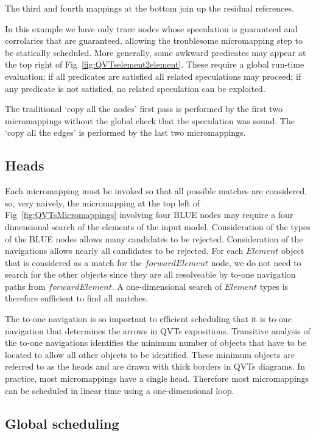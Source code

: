 \documentclass{llncs}
\begin{document}
The third and fourth mappings at the bottom join up the residual references.

In this example we have only trace nodes whose speculation is guaranteed and corrolaries that are guaranteed, allowing the troublesome micromapping step to be statically scheduled. More generally, some awkward predicates may appear at the top right of Fig~\ref{fig:QVTselement2element}. These require a global run-time evaluation; if all predicates are satisfied all related speculations may proceed; if any predicate is not satisfied, no related speculation can be exploited.

The traditional `copy all the nodes' first pass is performed by the first two micromappings without the global check that the speculation was sound. The `copy all the edges' is performed by the last two micromappings.

\subsection{Heads}\label{Heads}

Each micromapping must be invoked so that all possible matches are considered, so, very naively, the micromapping at the top left of Fig~\ref{fig:QVTsMicromappings} involving four BLUE nodes may require a four dimensional search of the elements of the input model. Consideration of the types of the BLUE nodes allows many candidates to be rejected. Consideration of the navigations allows nearly all candidates to be rejected. For each $Element$ object that is considered as a match for the $forwardElement$ node, we do not need to search for the other objects since they are all resolveable by to-one navigation paths from $forwardElement$. A one-dimensional search of $Element$ types is therefore sufficient to find all matches.

The to-one navigation is so important to efficient scheduling that it is to-one navigation that determines the arrows in QVTs expositions. Transitive analysis of the to-one navigations identifies the minimum number of objects that have to be located to allow all other objects to be identified. These minimum objects are referred to as the heads and are drawn with thick borders in QVTs diagrams. In practice, most micromappings have a single head. Therefore most micromappings can be scheduled in linear time using a one-dimensional loop. 

\subsection{Global scheduling}
\end{document}
